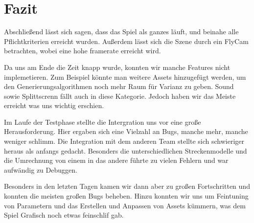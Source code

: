 \documentclass[parskip=full]{scrartcl}
\begin{document}
	\pagebreak

	\section{Fazit}

	Abschließend lässt sich sagen, dass das Spiel als ganzes läuft, und beinahe alle Pflichtkriterien erreicht wurden.
	Außerdem lässt sich die Szene durch ein FlyCam betrachten, wobei eine hohe framerate erreicht wird.

	Da uns am Ende die Zeit knapp wurde, konnten wir manche Features nicht implemetieren.
	Zum Beispiel könnte man weitere Assets hinzugefügt werden, um
	den Generierungsalgorithmen noch mehr Raum für Varianz zu geben.
	Sound sowie Splittscrenn fällt auch in diese Kategorie.
	Jedoch haben wir das Meiste erreicht was uns wichtig erschien.

	Im Laufe der Testphase stellte die Intergration uns vor eine große Herausforderung.
	Hier ergaben sich eine Vielzahl an Bugs, manche mehr, manche weniger schlimm.
	Die Integration mit dem anderen Team stellte sich schwieriger heraus als anfangs gedacht.
	Besonders die unterschiedlichen Streckenmodelle und die Umrechnung von einem in das andere führte zu vielen Fehlern und
	war aufwändig zu Debuggen.

	Besonders in den letzten Tagen kamen wir dann aber zu großen Fortschritten
	und konnten die meisten großen Bugs beheben.
	Hinzu konnten wir uns um Feintuning von Parametern
	und das Erstellen und Anpassen von Assets kümmern,
	was dem Spiel Grafisch noch etwas feinschlif gab.
\end{document}
